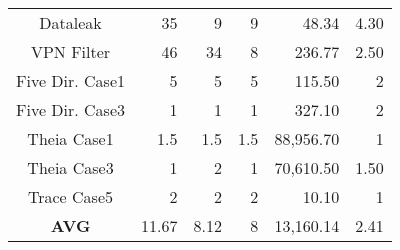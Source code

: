 \begin{table}[t]
{\begin{tabular}{@{}crrrrr@{}}
Dataleak             & 35                                    & 9                                           & 9                                     & 48.34                                    & 4.30                                 \\
VPN Filter           & 46                                    & 34                                          & 8                                     & 236.77                                   & 2.50                                 \\
Five Dir. Case1      & 5                                     & 5                                           & 5                                     & 115.50                                   & 2                                 \\
Five Dir. Case3      & 1                                     & 1                                           & 1                                     & 327.10                                   & 2                                 \\
Theia Case1          & 1.5                                     & 1.5                                           & 1.5                                     & 88,956.70                                & 1                                 \\
Theia Case3          & 1                                     & 2                                           & 1                                     & 70,610.50                                & 1.50                                 \\
Trace Case5          & 2                                     & 2                                           & 2                                     & 10.10                                    & 1                                 \\
\textbf{AVG}         & 11.67                                    & 8.12                                           & 8                                     & 13,160.14                                & 2.41                                 \\ \bottomrule
\end{tabular}
}
\end{table}